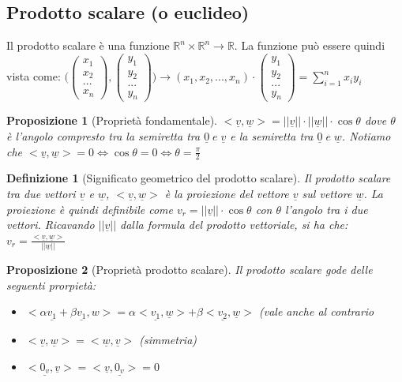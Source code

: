 \documentclass[12pt]{article}
\newenvironment{para}{\begin{adjustwidth}{13mm}{}}{\end{adjustwidth}}
\newtheorem{Definizione}{Definizione}[subsection]
\newtheorem{Proposizione}{Proposizione}[subsection]
\begin{document}
\begin{para}
\subsection{Prodotto scalare (o euclideo)}
Il prodotto scalare è una funzione $\mathbb{R}^n \times \mathbb{R}^n \rightarrow \mathbb{R}$. La funzione può essere quindi vista come: $\Biggl(\begin{pmatrix}
    x_1 \\
    x_2 \\
    ... \\
    x_n
\end{pmatrix} , \begin{pmatrix}
    y_1 \\
    y_2 \\
    ... \\
    y_n
\end{pmatrix}\Biggr) \rightarrow (x_1, x_2, ..., x_n) \cdot \begin{pmatrix}
    y_1 \\
    y_2 \\
    ... \\
    y_n
\end{pmatrix} = \sum_{i=1}^n x_i y_i$
\begin{Proposizione}[Proprietà fondamentale]
$<\underline{v}, \underline{w}> = \bigl||\underline{v}|\bigr| \cdot \bigl||\underline{w}|\bigr| \cdot \cos{\theta}$ dove $\theta$ è l'angolo compresto tra la semiretta tra $\underline{0} \; e \; \underline{v}$ e la semiretta tra $\underline{0} \; e \; \underline{w}$. Notiamo che $<\underline{v}, \underline{w}> = 0 \Leftrightarrow \cos{\theta} = 0 \Leftrightarrow \theta = \frac{\pi}{2}$
\end{Proposizione}
\begin{Definizione}[Significato geometrico del prodotto scalare]
Il prodotto scalare tra due vettori $\underline{v}$ e $\underline{w}$, $<\underline{v},\underline{w}>$ è la proiezione del vettore $\underline{v}$ sul vettore $\underline{w}$. La proiezione è quindi definibile come $v_r = \bigr||\underline{v}|\bigl| \cdot \cos{\theta}$ con $\theta$ l'angolo tra i due vettori. Ricavando $\bigr||\underline{v}|\bigl|$ dalla formula del prodotto vettoriale, si ha che: $v_r = \frac{<\underline{v},\underline{w}>}{\bigr||\underline{w}|\bigl|}$
\end{Definizione}
\begin{Proposizione}[Proprietà prodotto scalare]
Il prodotto scalare gode delle seguenti prorpietà:\begin{itemize}
    \item $<\alpha \underline{v_1} + \beta \underline{v_1}, w> = \alpha<\underline{v_1}, \underline{w}> + \beta <\underline{v_2}, \underline{w}>$ (vale anche al contrario
    \item $<\underline{v}, \underline{w}> = <\underline{w}, \underline{v}>$ (simmetria)
    \item $<\underline{0_v}, \underline{v}> = <\underline{v}, \underline{0_v}> = 0$
\end{itemize}


\end{Proposizione}
\end{para}
\end{document}
